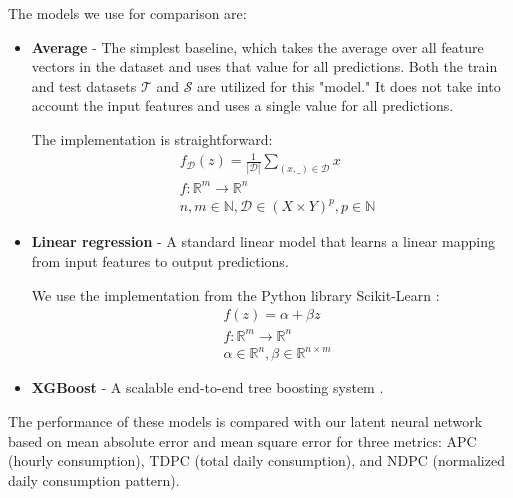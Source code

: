 The models we use for comparison are:

\begin{itemize}
    \item \textbf{Average} - The simplest baseline, which takes the average over all feature vectors in the dataset and uses that value for all predictions. Both the train and test datasets $\mathcal{T}$ and $\mathcal{S}$ are utilized for this "model." It does not take into account the input features and uses a single value for all predictions.

          The implementation is straightforward:
          \begin{equation}
              \begin{split}
                   & f_{\mathcal{D}}(z) = \frac{1}{|\mathcal{D}|} \sum_{(x,\_) \in \mathcal{D}} x \\
                   & f: \mathbb{R}^m \rightarrow \mathbb{R}^n                                     \\
                   & n,m \in \mathbb{N}, \mathcal{D} \in (X \times Y)^p, p \in \mathbb{N}
              \end{split}
          \end{equation}


    \item \textbf{Linear regression} - A standard linear model that learns a linear mapping from input features to output predictions.

          We use the implementation from the Python library Scikit-Learn :
          \begin{equation}
              \begin{split}
                   & f(z) = \alpha + \beta z                                    \\
                   & f: \mathbb{R}^m \rightarrow \mathbb{R}^n                   \\
                   & \alpha \in \mathbb{R}^n, \beta \in \mathbb{R}^{n \times m}
              \end{split}
          \end{equation}
    \item \textbf{XGBoost} - A scalable end-to-end tree boosting system .
\end{itemize}

The performance of these models is compared with our latent neural network based on mean absolute error and mean square error for three metrics: \acrlong{APC} (hourly consumption), \acrlong{TDPC} (total daily consumption), and \acrlong{NDPC} (normalized daily consumption pattern).
